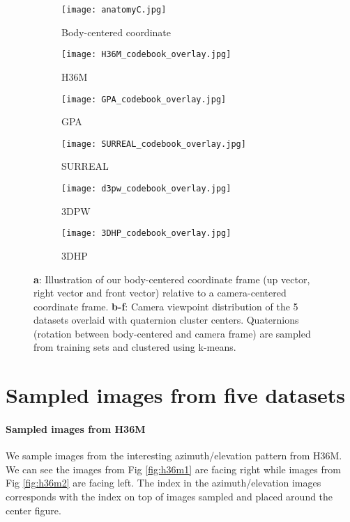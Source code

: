 \documentclass[runningheads]{llncs}
\begin{document}
\begin{figure*}[t]
\centering
\begin{subfigure}{0.36\textwidth}
\texttt{[image: anatomyC.jpg]}
\caption{Body-centered coordinate} \label{fig:2a}
\end{subfigure}
\hspace*{\fill}
\begin{subfigure}{0.30\textwidth}
\texttt{[image: H36M\_codebook\_overlay.jpg]}
\caption{\textsc{H36M}} \label{fig:2b}
\end{subfigure}
\hspace*{\fill}
\begin{subfigure}{0.30\textwidth}
\texttt{[image: GPA\_codebook\_overlay.jpg]}
\caption{\textsc{GPA}} \label{fig:2c}
\end{subfigure}
\hspace*{\fill}
\begin{subfigure}{0.32\textwidth}
\texttt{[image: SURREAL\_codebook\_overlay.jpg]}
\caption{\textsc{SURREAL}} \label{fig:2d}
\end{subfigure}
\hspace*{\fill}
\begin{subfigure}{0.32\textwidth}
\texttt{[image: d3pw\_codebook\_overlay.jpg]}
\caption{\textsc{3DPW}} \label{fig:2e}
\end{subfigure}
\hspace*{\fill}
\begin{subfigure}{0.32\textwidth}
\texttt{[image: 3DHP\_codebook\_overlay.jpg]}
\caption{\textsc{3DHP}} \label{fig:2f}
\end{subfigure}
\caption{\textbf{a}: Illustration of our body-centered coordinate frame (up
vector, right vector and front vector) relative to a camera-centered coordinate
frame. \textbf{b-f}: Camera viewpoint distribution 
of the 5 datasets overlaid with quaternion cluster centers. Quaternions (rotation 
between body-centered and camera frame) are
sampled from training sets and clustered using k-means.}
\label{fig:body-centeredUFR}
\vspace{-0.15in}
\end{figure*}


\section{Sampled images from five datasets}

\paragraph{Sampled images from H36M} We sample images from the interesting azimuth/elevation pattern from H36M. We can see the images from Fig \ref{fig:h36m1} are facing right while images from Fig \ref{fig:h36m2} are facing left. The index in the azimuth/elevation images corresponds with the index on top of images sampled and placed around the center figure.
\end{document}
